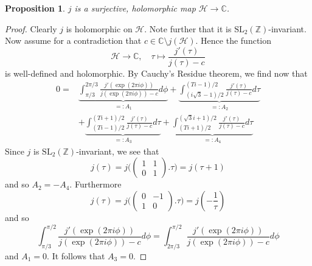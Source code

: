 \documentclass{scrartcl}
\newcommand{\Z}{\mathbb{Z}}
\newcommand{\C}{\mathbb{C}}
\newcommand{\Half}{\mathcal{H}}
\newcommand{\SL}{\mathrm{SL}}
\newtheorem{prop}{Proposition}[section]
\theoremstyle{definition}
\begin{document}
\begin{prop}
    $j$ is a surjective, holomorphic map $\Half \to \C$.
\end{prop}
\begin{proof}
    Clearly $j$ is holomorphic on $\Half$.
    Note further that it is $\SL_2(\Z)$-invariant.
    Now assume for a contradiction that $c \in \C \setminus j(\Half)$.
    Hence the function
    \begin{equation*}
        \Half \to \C, \quad \tau \mapsto \frac {j'(\tau)} {j(\tau) - c}
    \end{equation*}
    is well-defined and holomorphic.
    By Cauchy's Residue theorem, we find now that
    \begin{align*}
        0 = &\underbrace{\int_{\pi/3}^{2\pi/3} \frac {j'(\exp(2\pi i \phi))} {j(\exp(2\pi i \phi)) - c} d\phi}_{=: A_1} + \underbrace{\int_{(i\sqrt{3} - 1)/2}^{(Ti - 1)/2} \frac {j'(\tau)} {j(\tau) - c} d\tau}_{=: A_2} \\
        &+ \underbrace{\int_{(Ti - 1)/2}^{(Ti + 1)/2} \frac {j'(\tau)} {j(\tau) - c} d\tau}_{=: A_3} + \underbrace{\int_{(Ti + 1)/2}^{(\sqrt{3}i + 1)/2} \frac {j'(\tau)} {j(\tau) - c} d\tau}_{=: A_4}
    \end{align*}
    Since $j$ is $\SL_2(\Z)$-invariant, we see that
    \begin{equation*}
        j(\tau) = j\bigl( \left(\begin{matrix} 1 & 1 \\ 0 & 1 \end{matrix}\right).\tau \bigr) = j(\tau + 1)
    \end{equation*}
    and so $A_2 = -A_4$.
    Furthermore
    \begin{equation*}
        j(\tau) = j\bigl( \left( \begin{matrix} 0 & -1 \\ 1 & 0 \end{matrix} \right).\tau \bigr) = j\left( -\frac 1 \tau \right)
    \end{equation*}
    and so
    \begin{equation*}
        \int_{\pi/3}^{\pi/2} \frac {j'(\exp(2\pi i \phi))} {j(\exp(2\pi i \phi)) - c} d\phi = \int_{2\pi/3}^{\pi/2} \frac {j'(\exp(2\pi i \phi))} {j(\exp(2\pi i \phi)) - c} d\phi
    \end{equation*}
    and $A_1 = 0$.
    It follows that $A_3 = 0$.


\end{proof}
\end{document}
